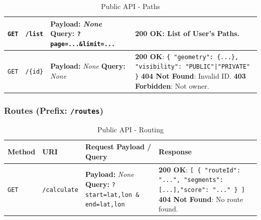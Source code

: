 \begin{table}[H]
\begin{tabularx}{\textwidth}{|l|p{2.5cm}|p{4cm}|X|}
    \texttt{GET} & \texttt{/list} & 
    \textbf{Payload:} \newline \textit{None} \newline \textbf{Query:} \newline \texttt{?page=...\&limit=...} & 
    \textbf{200 OK}: List of User's Paths. \\ \hline
    
    \texttt{GET} & \texttt{/\{id\}} & 
    \textbf{Payload:} \newline \textit{None} \newline \textbf{Query:} \newline \textit{None} & 
    \textbf{200 OK}: 
    \texttt{\{ "geometry": \{...\}, \newline "visibility": \newline "PUBLIC"|"PRIVATE" \}} \newline
    \textbf{404 Not Found}: Invalid ID. \newline
    \textbf{403 Forbidden}: Not owner. \\ \hline
    \end{tabularx}
    \caption{Public API - Paths}
    \label{tab:api_public_paths}
\end{table}

\subsubsection*{Routes (Prefix: \texttt{/routes})}
\begin{table}[H]
    \sf
    \small
    \centering
    \renewcommand{\arraystretch}{1.5}
    \begin{tabularx}{\textwidth}{|l|p{2.5cm}|p{4cm}|X|}
    \hline
    \rowcolor{lightgray}\textbf{Method} & \textbf{URI} & \textbf{Request Payload / Query} & \textbf{Response} \\ \hline
    
    \texttt{GET} & \texttt{/calculate} & 
    \textbf{Payload:} \newline \textit{None} \newline \textbf{Query:} \newline \texttt{?start=lat,lon \& \newline end=lat,lon} & 
    \textbf{200 OK}: \newline \texttt{[ \{ "routeId": "...", \newline "segments": [...],\newline "score": "..." \} ]} \newline
    \textbf{404 Not Found}: No route found. \\ \hline
    \end{tabularx}
    \caption{Public API - Routing}
    \label{tab:api_public_routes}
    \end{table}
    
